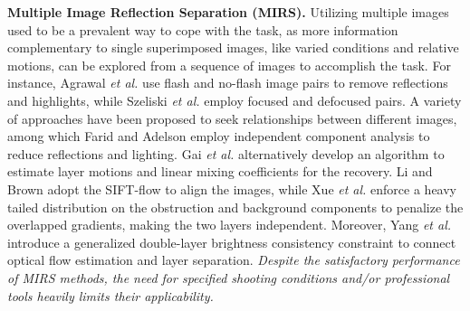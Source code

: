 \documentclass{article}
\begin{document}
\textbf{Multiple Image Reflection Separation (MIRS).} Utilizing multiple images \cite{DBLP:conf/cvpr/FaridA99,DBLP:journals/ijcv/SchechnerKB00,DBLP:conf/cvpr/SzeliskiAA00,DBLP:conf/eccv/SarelI04,DBLP:journals/tog/AgrawalRNL05,DBLP:journals/pami/GaiSZ12,DBLP:journals/tog/SinhaKGSS12,DBLP:conf/iccv/LiB13,DBLP:conf/cvpr/GuoCM14,DBLP:conf/cvpr/SimonP15,DBLP:journals/tog/Freeman15,DBLP:conf/mm/SunLYZWL16,DBLP:conf/cvpr/YangLDT16,DBLP:conf/cvpr/HanS17} used to be a prevalent way to cope with the task, as more information complementary to single superimposed images, like varied conditions and relative motions, can be explored from a sequence of images to accomplish the task. For instance, Agrawal \emph{et al.} \cite{DBLP:journals/tog/AgrawalRNL05} use flash and no-flash image pairs to remove reflections and highlights, while Szeliski \emph{et al.} \cite{DBLP:conf/cvpr/SzeliskiAA00} employ focused and defocused pairs. A variety of approaches \cite{DBLP:conf/cvpr/FaridA99, DBLP:conf/eccv/SarelI04,DBLP:journals/pami/GaiSZ12,DBLP:conf/iccv/LiB13,DBLP:conf/cvpr/SzeliskiAA00,DBLP:journals/tog/Freeman15,DBLP:conf/cvpr/YangLDT16} have been proposed to seek relationships between different images, among which Farid and Adelson \cite{DBLP:conf/cvpr/FaridA99} employ independent component analysis to reduce reflections and lighting. Gai \emph{et al.} \cite{DBLP:journals/pami/GaiSZ12} alternatively develop an algorithm to estimate layer motions and linear mixing coefficients for the recovery. Li and Brown \cite{DBLP:conf/iccv/LiB13} adopt the SIFT-flow to align the images, while Xue \emph{et al.} \cite{DBLP:journals/tog/Freeman15} enforce a heavy tailed distribution on the obstruction and background components to penalize the overlapped gradients, making the two layers independent. Moreover, Yang \emph{et al.} \cite{DBLP:conf/cvpr/YangLDT16} introduce a generalized double-layer brightness consistency constraint to connect optical flow estimation and layer separation.
\emph{Despite the satisfactory performance of MIRS methods, the need for specified shooting conditions and/or professional tools heavily limits their applicability.} 
\end{document}
